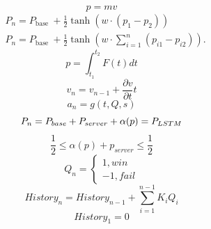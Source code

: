 \begin{equation}
p=m v
\end{equation}
\begin{equation}
\begin{aligned}
& P_n=P_{\text {base }}+\frac{1}{2} \tanh \left(w \cdot\left({p_1-p_2}\right)\right) \\
& P_n=P_{\text {base }}+\frac{1}{2} \tanh \left(w \cdot\sum_{i=1}^n\left(p_{i 1}-p_{i 2}\right)\right).
\end{aligned}
\end{equation}
\begin{equation}
p=\int_{t_1}^{t_2} F(t) d t
\end{equation}
\begin{equation}v_{n}=v_{n-1}+\frac{\partial v}{\partial t} t
\end{equation}
\begin{equation}a_{n}=g(t,Q,s)\end{equation}
\begin{equation}P_{n}=P_{base}+P_{server}\\+\alpha (p)=P_{LSTM}\end{equation}
\begin{equation}\frac{1}{2}\leq\alpha(p)+p_{server}\leq\frac{1}{2}\end{equation}
\begin{equation}Q_{n}=\begin{cases}1,win\\-1,fail\end{cases}\end{equation}
\begin{equation}History_{n}=History_{n-1}+\sum_{i=1}^{n-1}K_{i}Q_{i}\end{equation}
\begin{equation}History_{1}=0\end{equation}
